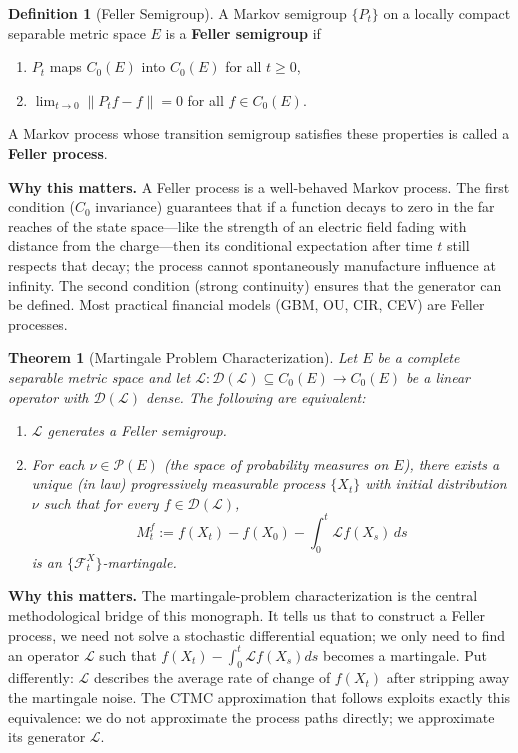 \documentclass[11pt,a4paper,openany]{book}
\theoremstyle{definition}
\newtheorem{definition}{Definition}[chapter]
\theoremstyle{plain}
\newtheorem{theorem}{Theorem}[chapter]
\theoremstyle{remark}
\newcommand{\1}{\mathbbm{1}}
\newcommand{\F}{\mathcal{F}}
\newcommand{\calL}{\mathcal{L}}
\newcommand{\calD}{\mathcal{D}}
\newcommand{\calP}{\mathcal{P}}
\begin{document}
\begin{definition}[Feller Semigroup]
A Markov semigroup $\{P_{t}\}$ on a locally compact separable metric space $E$ is a \textbf{Feller semigroup} if
\begin{enumerate}[label=(\arabic*)]
    \item $P_{t}$ maps $C_{0}(E)$ into $C_{0}(E)$ for all $t \geq 0$,
    \item $\lim_{t \to 0} \|P_{t} f - f\| = 0$ for all $f \in C_{0}(E)$.
\end{enumerate}
A Markov process whose transition semigroup satisfies these properties is called a \textbf{Feller process}.
\end{definition}

\medskip
\noindent\textbf{Why this matters.} A Feller process is a well-behaved Markov process. The first condition ($C_0$ invariance) guarantees that if a function decays to zero in the far reaches of the state space---like the strength of an electric field fading with distance from the charge---then its conditional expectation after time $t$ still respects that decay; the process cannot spontaneously manufacture influence at infinity. The second condition (strong continuity) ensures that the generator can be defined. Most practical financial models (GBM, OU, CIR, CEV) are Feller processes.

\begin{theorem}[Martingale Problem Characterization]
Let $E$ be a complete separable metric space and let $\calL: \calD(\calL) \subseteq C_{0}(E) \to C_{0}(E)$ be a linear operator with $\calD(\calL)$ dense. The following are equivalent:
\begin{enumerate}[label=(\arabic*)]
    \item $\calL$ generates a Feller semigroup.
    \item For each $\nu \in \calP(E)$ (the space of probability measures on $E$), there exists a unique (in law) progressively measurable process $\{X_{t}\}$ with initial distribution $\nu$ such that for every $f \in \calD(\calL)$,
    \[
    M_{t}^{f} := f(X_{t}) - f(X_{0}) - \int_{0}^{t} \calL f(X_{s}) \, ds
    \]
    is an $\{\F_{t}^{X}\}$-martingale.
\end{enumerate}
\end{theorem}

\medskip
\noindent\textbf{Why this matters.} The martingale-problem characterization is the central methodological bridge of this monograph. It tells us that to construct a Feller process, we need not solve a stochastic differential equation; we only need to find an operator $\mathcal{L}$ such that $f(X_t) - \int_0^t \mathcal{L}f(X_s) ds$ becomes a martingale. Put differently: $\mathcal{L}$ describes the average rate of change of $f(X_t)$ after stripping away the martingale noise. The CTMC approximation that follows exploits exactly this equivalence: we do not approximate the process paths directly; we approximate its generator $\mathcal{L}$.
\end{document}
